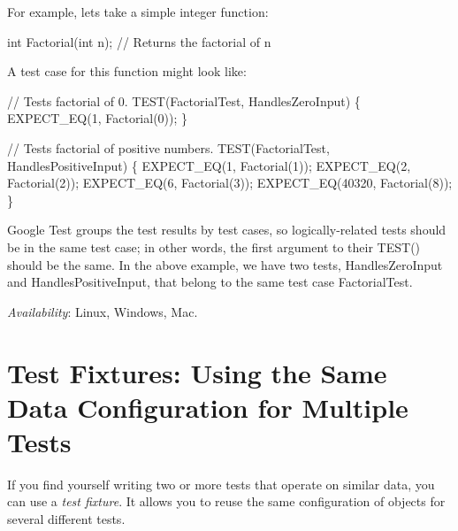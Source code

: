 For example, let\textquotesingle{}s take a simple integer function\+: 
\begin{DoxyCode}
int Factorial(int n); // Returns the factorial of n
\end{DoxyCode}


A test case for this function might look like\+: 
\begin{DoxyCode}
// Tests factorial of 0.
TEST(FactorialTest, HandlesZeroInput) \{
  EXPECT\_EQ(1, Factorial(0));
\}

// Tests factorial of positive numbers.
TEST(FactorialTest, HandlesPositiveInput) \{
  EXPECT\_EQ(1, Factorial(1));
  EXPECT\_EQ(2, Factorial(2));
  EXPECT\_EQ(6, Factorial(3));
  EXPECT\_EQ(40320, Factorial(8));
\}
\end{DoxyCode}


Google Test groups the test results by test cases, so logically-\/related tests should be in the same test case; in other words, the first argument to their {\ttfamily T\+E\+S\+T()} should be the same. In the above example, we have two tests, {\ttfamily Handles\+Zero\+Input} and {\ttfamily Handles\+Positive\+Input}, that belong to the same test case {\ttfamily Factorial\+Test}.

{\itshape Availability}\+: Linux, Windows, Mac.

\section*{Test Fixtures\+: Using the Same Data Configuration for Multiple Tests}

If you find yourself writing two or more tests that operate on similar data, you can use a {\itshape test fixture}. It allows you to reuse the same configuration of objects for several different tests.

